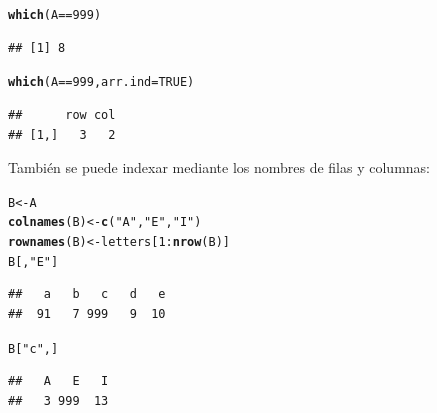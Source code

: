 \documentclass{config/apuntes}\usepackage[]{graphicx}\usepackage[]{xcolor}
\makeatletter
\newcommand{\hlnum}[1]{\textcolor[rgb]{0.686,0.059,0.569}{#1}}%
\newcommand{\hlsng}[1]{\textcolor[rgb]{0.192,0.494,0.8}{#1}}%
\newcommand{\hlopt}[1]{\textcolor[rgb]{0,0,0}{#1}}%
\newcommand{\hldef}[1]{\textcolor[rgb]{0.345,0.345,0.345}{#1}}%
\newcommand{\hlkwb}[1]{\textcolor[rgb]{0.69,0.353,0.396}{#1}}%
\newcommand{\hlkwc}[1]{\textcolor[rgb]{0.333,0.667,0.333}{#1}}%
\newcommand{\hlkwd}[1]{\textcolor[rgb]{0.737,0.353,0.396}{\textbf{#1}}}%
\newenvironment{kframe}{%
 \def\at@end@of@kframe{}%
 \ifinner\ifhmode%
  \def\at@end@of@kframe{\end{minipage}}%
  \begin{minipage}{\columnwidth}%
 \fi\fi%
 \def\FrameCommand##1{\hskip\@totalleftmargin \hskip-\fboxsep
 \colorbox{shadecolor}{##1}\hskip-\fboxsep
     \hskip-\linewidth \hskip-\@totalleftmargin \hskip\columnwidth}%
 \MakeFramed {\advance\hsize-\width
   \@totalleftmargin\z@ \linewidth\hsize
   \@setminipage}}%
 {\par\unskip\endMakeFramed%
 \at@end@of@kframe}
\newenvironment{knitrout}{}{} %
\makeatother
\begin{document}
\begin{knitrout}
\color{fgcolor}\begin{kframe}
\begin{alltt}
\hlkwd{which}\hldef{(A} \hlopt{==} \hlnum{999}\hldef{)}
\end{alltt}
\begin{verbatim}
## [1] 8
\end{verbatim}
\begin{alltt}
\hlkwd{which}\hldef{(A} \hlopt{==} \hlnum{999}\hldef{,} \hlkwc{arr.ind} \hldef{=} \hlnum{TRUE}\hldef{)}
\end{alltt}
\begin{verbatim}
##      row col
## [1,]   3   2
\end{verbatim}
\end{kframe}
\end{knitrout}

También se puede indexar mediante los nombres de filas y columnas:
\begin{knitrout}
\color{fgcolor}\begin{kframe}
\begin{alltt}
\hldef{B} \hlkwb{<-} \hldef{A}
\hlkwd{colnames}\hldef{(B)} \hlkwb{<-} \hlkwd{c}\hldef{(}\hlsng{"A"}\hldef{,} \hlsng{"E"}\hldef{,} \hlsng{"I"}\hldef{)}
\hlkwd{rownames}\hldef{(B)} \hlkwb{<-} \hldef{letters[}\hlnum{1}\hlopt{:}\hlkwd{nrow}\hldef{(B)]}
\hldef{B[,} \hlsng{"E"}\hldef{]}
\end{alltt}
\begin{verbatim}
##   a   b   c   d   e 
##  91   7 999   9  10
\end{verbatim}
\begin{alltt}
\hldef{B[}\hlsng{"c"}\hldef{, ]}
\end{alltt}
\begin{verbatim}
##   A   E   I 
##   3 999  13
\end{verbatim}
\end{kframe}
\end{knitrout}
\end{document}

